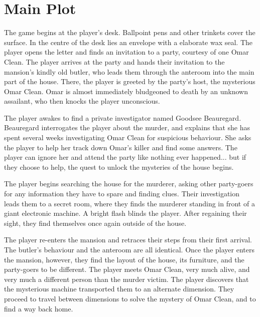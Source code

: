 \section{Main Plot}
\label{sec:mainplot}
The game begins at the player's desk. Ballpoint pens and other trinkets cover the surface. In the centre of the desk lies an envelope with a elaborate wax seal. The player opens the letter and finds an invitation to a party, courtesy of one Omar Clean. The player arrives at the party and hands their invitation to the mansion's kindly old butler, who leads them through the anteroom into the main part of the house. There, the player is greeted by the party's host, the mysterious Omar Clean. Omar is almost immediately bludgeoned to death by an unknown assailant, who then knocks the player unconscious.

The player awakes to find a private investigator named Goodsee Beauregard. Beauregard interrogates the player about the murder, and explains that she has spent several weeks investigating Omar Clean for suspicious behaviour. She asks the player to help her track down Omar's killer and find some answers. The player can ignore her and attend the party like nothing ever happened... but if they choose to help, the quest to unlock the mysteries of the house begins.

The player begins searching the house for the murderer, asking other party-goers for any information they have to spare and finding clues. Their investigation leads them to a secret room, where they finds the murderer standing in front of a giant electronic machine. A bright flash blinds the player. After regaining their sight, they find themselves once again outside of the house.

The player re-enters the mansion and retraces their steps from their first arrival. The butler's behaviour and the anteroom are all identical. Once the player enters the mansion, however, they find the layout of the house, its furniture, and the party-goers to be different. The player meets Omar Clean, very much alive, and very much a different person than the murder victim. The player discovers that the mysterious machine transported them to an alternate dimension. They proceed to travel between dimensions to solve the mystery of Omar Clean, and to find a way back home.


